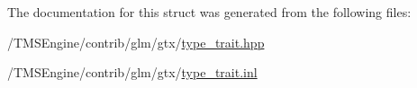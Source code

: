 The documentation for this struct was generated from the following files\+:\begin{DoxyCompactItemize}
\item 
/\+T\+M\+S\+Engine/contrib/glm/gtx/\hyperlink{type__trait_8hpp}{type\+\_\+trait.\+hpp}\item 
/\+T\+M\+S\+Engine/contrib/glm/gtx/\hyperlink{type__trait_8inl}{type\+\_\+trait.\+inl}\end{DoxyCompactItemize}
